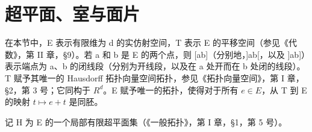 \section{超平面、室与面片}

在本节中，E 表示有限维为 d 的实仿射空间，T 表示 E 的平移空间（参见《代数》，第 II 章，§9）。若 a 和 b 是 E 的两个点，则 {[}ab{]}（分别地，{]}ab{[}，以及 {]}ab{]}）表示端点为 a、b 的闭线段（分别为开线段，以及在 a 处开而在 b 处闭的线段）。T 赋予其唯一的 Hausdorff 拓扑向量空间拓扑，参见《拓扑向量空间》，第 I 章，§2，第 3 号；它同构于 \(R^{d}\)。E 赋予唯一的拓扑，使得对于所有 \(e \in E\)，从 T 到 E 的映射 \(t \mapsto e + t\) 是同胚。

记 H 为 E 的一个局部有限超平面集（《一般拓扑》，第 I 章，§1，第 5 号）。

